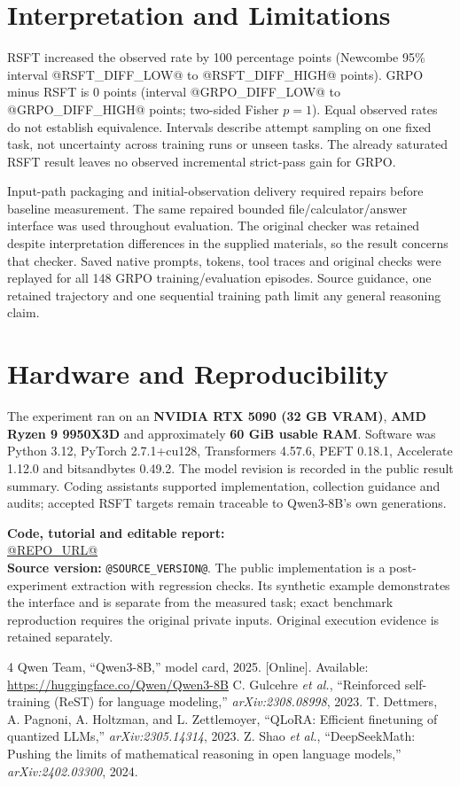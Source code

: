 \documentclass[10pt,journal,onecolumn,a4paper]{IEEEtran}
\begin{document}
\section{Interpretation and Limitations}
RSFT increased the observed rate by 100 percentage points (Newcombe 95\% interval @RSFT_DIFF_LOW@ to @RSFT_DIFF_HIGH@ points). GRPO minus RSFT is 0 points (interval @GRPO_DIFF_LOW@ to @GRPO_DIFF_HIGH@ points; two-sided Fisher $p=1$). Equal observed rates do not establish equivalence. Intervals describe attempt sampling on one fixed task, not uncertainty across training runs or unseen tasks. The already saturated RSFT result leaves no observed incremental strict-pass gain for GRPO.

Input-path packaging and initial-observation delivery required repairs before baseline measurement. The same repaired bounded file/calculator/answer interface was used throughout evaluation. The original checker was retained despite interpretation differences in the supplied materials, so the result concerns that checker. Saved native prompts, tokens, tool traces and original checks were replayed for all 148 GRPO training/evaluation episodes. Source guidance, one retained trajectory and one sequential training path limit any general reasoning claim.

\section{Hardware and Reproducibility}
The experiment ran on an \textbf{NVIDIA RTX 5090 (32 GB VRAM)}, \textbf{AMD Ryzen 9 9950X3D} and approximately \textbf{60 GiB usable RAM}. Software was Python 3.12, PyTorch 2.7.1+cu128, Transformers 4.57.6, PEFT 0.18.1, Accelerate 1.12.0 and bitsandbytes 0.49.2. The model revision is recorded in the public result summary. Coding assistants supported implementation, collection guidance and audits; accepted RSFT targets remain traceable to Qwen3-8B's own generations.

\noindent\textbf{Code, tutorial and editable report:}\\
\url{@REPO_URL@}\\
\textbf{Source version:} \texttt{@SOURCE_VERSION@}. The public implementation is a post-experiment extraction with regression checks. Its synthetic example demonstrates the interface and is separate from the measured task; exact benchmark reproduction requires the original private inputs. Original execution evidence is retained separately.

\begin{thebibliography}{4}
 Qwen Team, ``Qwen3-8B,'' model card, 2025. [Online]. Available: \url{https://huggingface.co/Qwen/Qwen3-8B}
 C. Gulcehre \emph{et al.}, ``Reinforced self-training (ReST) for language modeling,'' \emph{arXiv:2308.08998}, 2023.
 T. Dettmers, A. Pagnoni, A. Holtzman, and L. Zettlemoyer, ``QLoRA: Efficient finetuning of quantized LLMs,'' \emph{arXiv:2305.14314}, 2023.
 Z. Shao \emph{et al.}, ``DeepSeekMath: Pushing the limits of mathematical reasoning in open language models,'' \emph{arXiv:2402.03300}, 2024.
\end{thebibliography}
\end{document}
